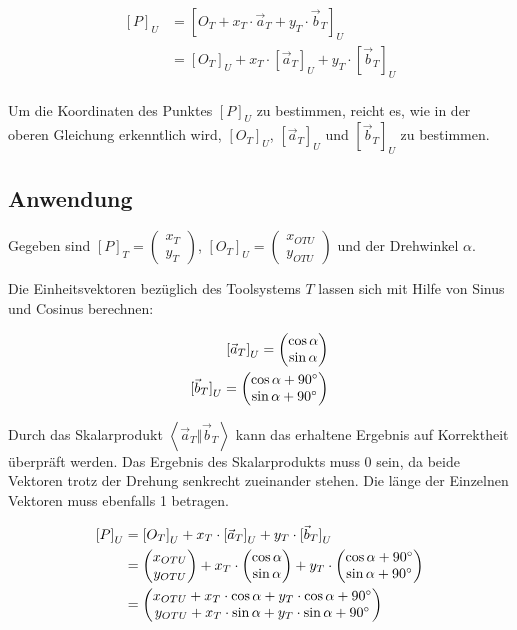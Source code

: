 \documentclass{article}
\newcommand{\m}[1]{\begin{pmatrix}#1\end{pmatrix}}
\begin{document}
    \[
        \begin{split}
            {[P]}_{U} &= {\left [{O}_{T} + {x}_{T} \cdot \vec{a}_T + {y}_{T} \cdot \vec{b}_T \right ]}_{U} \\
            &= {[O_T]}_{U} + x_T \cdot {[\vec{a}_T]}_U + y_T \cdot {[\vec{b}_T]}_U \\
        \end{split}
    \]

    Um die Koordinaten des Punktes ${[P]}_U$ zu bestimmen, reicht es, wie in der oberen Gleichung erkenntlich wird,
    ${[O_T]}_{U}$, ${[\vec{a}_T]}_U$ und ${[\vec{b}_T]}_U$ zu bestimmen.

    \subsection{Anwendung}

    Gegeben sind ${[P]}_T = \m{x_T \\ y_T}$, ${[O_T]}_{U} = \m{x_{OTU} \\ y_{OTU}}$ und der Drehwinkel $\alpha$.
    
    Die Einheitsvektoren bezüglich des Toolsystems $T$ lassen sich mit Hilfe von Sinus und Cosinus berechnen:

    \[
        \begin{split}
            {[\vec{a}_T]}_U = \m{\cos \alpha \\ \sin \alpha} \\
            {[\vec{b}_T]}_U = \m{\cos \alpha + 90 \degree \\ \sin \alpha + 90 \degree} \\
        \end{split}
    \]

    Durch das Skalarprodukt $\left \langle \vec{a}_T \Vert \vec{b}_T \right \rangle$ kann das erhaltene Ergebnis
    auf Korrektheit überpräft werden. Das Ergebnis des Skalarprodukts muss 0 sein, da beide Vektoren trotz der Drehung
    senkrecht zueinander stehen. Die länge der Einzelnen Vektoren muss ebenfalls 1 betragen. 

    \[
        \begin{split}
            {[P]}_{U} &= {[O_T]}_{U} + x_T \cdot {[\vec{a}_T]}_U + y_T \cdot {[\vec{b}_T]}_U \\
            &= \m{x_{OTU} \\ y_{OTU}} + x_T \cdot \m{\cos \alpha \\ \sin \alpha} + y_T \cdot \m{\cos \alpha + 90 \degree \\ \sin \alpha + 90 \degree} \\
            &= \m{x_{OTU} + x_T \cdot \cos \alpha + y_T \cdot \cos \alpha + 90 \degree \\ y_{OTU} + x_T \cdot \sin \alpha + y_T \cdot \sin \alpha + 90 \degree} \\
        \end{split}
    \]
\end{document}
